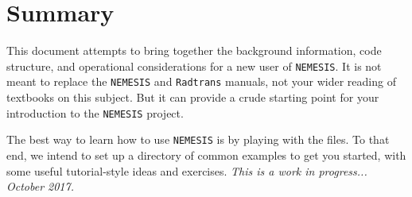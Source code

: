 \documentclass[final,5p,times,twocolumn,authoryear]{elsarticle}
\begin{document}
\section{Summary}

This document attempts to bring together the background information, code structure, and operational considerations for a new user of \verb#NEMESIS#.  It is not meant to replace the \verb#NEMESIS# and \verb#Radtrans# manuals, not your wider reading of textbooks on this subject.  But it can provide a crude starting point for your introduction to the \verb#NEMESIS# project.

The best way to learn how to use \verb#NEMESIS# is by playing with the files.  To that end, we intend to set up a directory of common examples to get you started, with some useful tutorial-style ideas and exercises.  \textit{This is a work in progress... October 2017.}   





\end{document}
